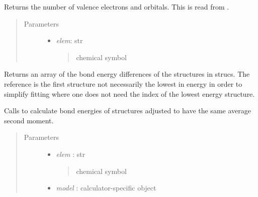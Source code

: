 \documentclass[letterpaper,10pt,english]{sphinxmanual}
\begin{document}
\begin{fulllineitems}
\begin{fulllineitems}
\end{fulllineitems}


\begin{fulllineitems}
\label{classes:catparam.CATParam.gen_valenceelectrons}
Returns the number of valence electrons and orbitals. This is read from
.
\begin{quote}\begin{description}
\item[{Parameters}] \leavevmode\begin{itemize}
\item {} 
\emph{elem}: str
\begin{quote}

chemical symbol
\end{quote}

\end{itemize}

\end{description}\end{quote}

\end{fulllineitems}


\begin{fulllineitems}
\label{classes:catparam.CATParam.get_SED}
Returns an array of the bond energy differences of the structures
in strucs. The reference is the first structure not necessarily the
lowest in energy in order to simplify fitting where one does not
need the index of the lowest energy structure.

Calls  to calculate bond energies of 
structures adjusted to have the same average second moment.
\begin{quote}\begin{description}
\item[{Parameters}] \leavevmode\begin{itemize}
\item {} 
\emph{elem} : str
\begin{quote}

chemical symbol
\end{quote}

\item {} 
\emph{model} : calculator-specific object
\begin{quote}


\end{quote}
\end{itemize}
\end{description}
\end{quote}
\end{fulllineitems}
\end{fulllineitems}
\end{document}
